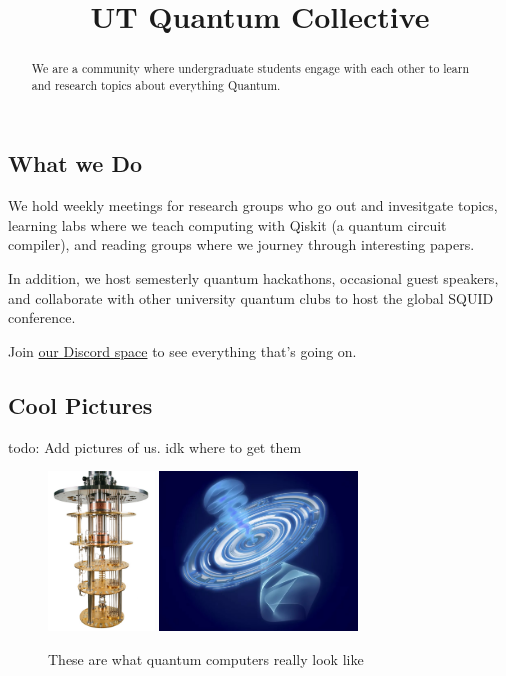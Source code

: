 \documentclass{article}
\title{UT Quantum Collective}
\begin{document}
\maketitle{}

\tableofcontents

\begin{abstract}
	We are a community where undergraduate students engage with each other to learn and research topics about everything Quantum.
\end{abstract}

\subsection{What we Do}
	We hold weekly meetings for research groups who go out and invesitgate topics, learning labs where we teach computing with Qiskit (a quantum circuit compiler), and reading groups where we journey through interesting papers.

	In addition, we host semesterly quantum hackathons, occasional guest speakers, and collaborate with other university quantum clubs to host the global SQUID conference.

	Join \href{https://discord.gg/UBnRaHuzF9}{our Discord space} to see everything that's going on.

	\subsection{Cool Pictures}

	todo: Add pictures of us. idk where to get them

	\begin{figure}[h!]
		\includegraphics[height=160px]{dilutionfridge_small.jpg}
		\includegraphics[height=160px]{real_qubit.jpg}
		\caption{These are what quantum computers really look like}
	\end{figure}
\end{document}
